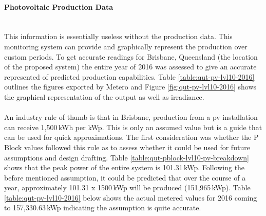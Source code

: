 \paragraph{Photovoltaic Production Data}
~\\
This information is essentially useless without the production data. This monitoring system can provide and graphically represent the production over custom periods. To get accurate readings for Brisbane, Queensland (the location of the proposed system) the entire year of 2016 was assessed to give an accurate represented of predicted production capabilities. Table \ref{table:qut-pv-lvl10-2016} outlines the figures exported by Metero and Figure \ref{fig:qut-pv-lvl10-2016} shows the graphical representation of the output as well as irradiance. 

\paragraph{}
An industry rule of thumb is that in Brisbane, production from a pv installation can receive 1,500\,kWh per kWp. This is only an assumed value but is a guide that can be used for quick approximations. The first consideration was whether the P Block values followed this rule as to assess whether it could be used for future assumptions and design drafting. Table \ref{table:qut-pblock-lvl10-pv-breakdown} shows that the peak power of the entire system is 101.31\,kWp. Following the before mentioned assumption, it could be predicted that over the course of a year, approximately 101.31 x 1500\,kWp will be produced (151,965\,kWp). Table \ref{table:qut-pv-lvl10-2016} below shows the actual metered values for 2016 coming to 157,330.63\,kWp indicating the assumption is quite accurate.   

